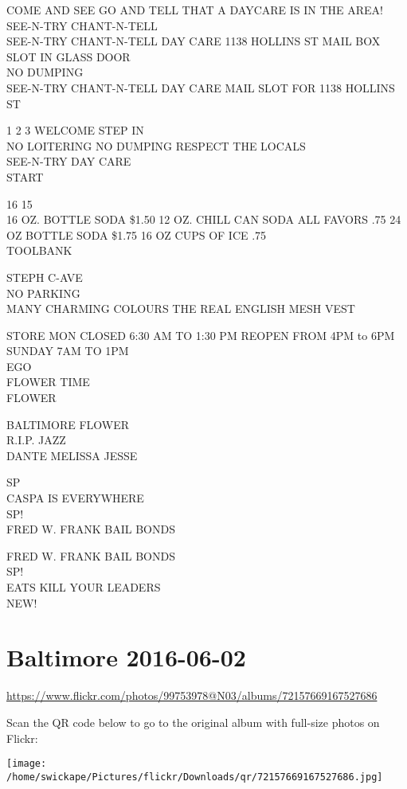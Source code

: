 \documentclass[10pt,letterpaper]{article}
\begin{document}
COME AND SEE GO AND TELL THAT A DAYCARE IS IN THE AREA!  SEE{-}N{-}TRY CHANT{-}N{-}TELL\\
SEE{-}N{-}TRY CHANT{-}N{-}TELL DAY CARE 1138 HOLLINS ST MAIL BOX SLOT IN GLASS DOOR\\
NO DUMPING\\
SEE{-}N{-}TRY CHANT{-}N{-}TELL DAY CARE MAIL SLOT FOR 1138 HOLLINS ST

1 2 3 WELCOME STEP IN\\
NO LOITERING NO DUMPING RESPECT THE LOCALS\\
SEE{-}N{-}TRY DAY CARE\\
START

16 15\\
16 OZ. BOTTLE SODA \$1.50 12 OZ. CHILL CAN SODA ALL FAVORS .75 24 OZ BOTTLE SODA \$1.75 16 OZ CUPS OF ICE .75\\
TOOLBANK

STEPH C{-}AVE\\
NO PARKING\\
MANY CHARMING COLOURS THE REAL ENGLISH MESH VEST

STORE MON CLOSED 6:30 AM TO 1:30 PM REOPEN FROM 4PM to 6PM SUNDAY 7AM TO 1PM\\
EGO\\
FLOWER TIME\\
FLOWER

BALTIMORE FLOWER\\
R.I.P. JAZZ\\
DANTE MELISSA JESSE

SP\\
CASPA IS EVERYWHERE\\
SP!\\
FRED W. FRANK BAIL BONDS

FRED W. FRANK BAIL BONDS\\
SP!\\
EATS KILL YOUR LEADERS\\
NEW!


\section*{Baltimore 2016-06-02}

\url{https://www.flickr.com/photos/99753978@N03/albums/72157669167527686}

Scan the QR code below to go to the original album with full-size photos on Flickr:

\texttt{[image: /home/swickape/Pictures/flickr/Downloads/qr/72157669167527686.jpg]}
\end{document}
